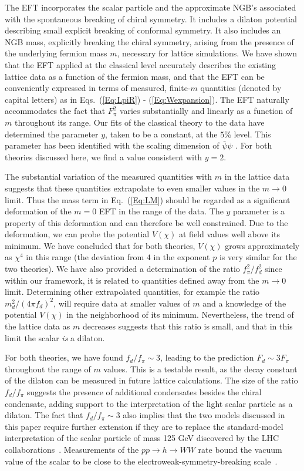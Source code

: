 \documentclass[a4paper,11pt]{article}
\begin{document}
The EFT incorporates the scalar particle and the approximate NGB's associated with the spontaneous breaking of chiral symmetry. 
It includes a dilaton potential describing small explicit breaking of conformal symmetry. It also includes an NGB mass, 
explicitly breaking the chiral symmetry, arising from the presence of the underlying fermion mass $m$, necessary for lattice simulations. 
We have shown that the EFT applied at the classical level accurately describes the existing lattice data as a function
of the fermion mass, and that the EFT can be conveniently expressed in terms of measured, finite-$m$ quantities (denoted by capital letters) as in Eqs.~(\ref{Eq:LpiR}) - (\ref{Eq:Wexpansion}).
The EFT naturally accommodates the fact that $F_{\pi}^2$ varies substantially and linearly as a function of $m$
throughout its range. Our fits of the classical theory to the data have determined the parameter $y$, taken to be a constant, at the $5\%$ level. This 
parameter has been identified with the scaling dimension of $\bar{\psi}\psi$ \cite{LLB}. For both theories discussed here, we find a value consistent with $y = 2$.

The substantial variation of the measured quantities with $m$ in the lattice data suggests that these quantities extrapolate to even smaller values in the $m \rightarrow 0$ limit. Thus the mass term in Eq.~(\ref{Eq:LM}) should be regarded as a significant deformation of the $m = 0$ EFT in the range of the data. The $y$ parameter is a property of this deformation and can therefore be well constrained. Due to the deformation, we can probe the potential $V(\chi)$ at field values well above its minimum. We have concluded that for both theories, $V(\chi)$ grows approximately as $\chi^4$ in this range (the deviation from $4$ in the exponent $p$ is very similar for the two theories). We have also provided a determination of the ratio $f_{\pi}^2/f_d^2$ since within our framework, it is related to quantities defined away from the $m \rightarrow 0$ limit. Determining other extrapolated quantities, for example the ratio $m_d^2/(4 \pi f_{d})^2$, will require data at smaller values of $m$ and a knowledge of the potential $V(\chi)$ in the neighborhood of its minimum. Nevertheless, the trend of the lattice data as $m$ decreases suggests that this ratio is small, and that in this limit the scalar \textit{is} a dilaton. 

For both theories, we have found  $f_d/f_\pi\sim3$, leading to the prediction $F_d \sim 3 F_{\pi}$ throughout the range of $m$ values. This is a testable result, as the decay constant of the dilaton can be measured in future lattice calculations. The size of the ratio $f_d/f_\pi$ suggests the presence of additional condensates besides the chiral condensate, adding support to the interpretation of the light scalar particle as a dilaton.  The fact that $f_d/f_\pi\sim3$ also implies that the two models discussed in this paper require further extension if they are to replace the standard-model interpretation of the scalar particle of mass 125 GeV discovered by the LHC collaborations~\cite{Aad:2012tfa,Chatrchyan:2012xdj}. Measurements of the $pp \rightarrow h \rightarrow WW$ rate bound the vacuum value of the scalar to be close to the electroweak-symmetry-breaking scale~\cite{TheATLASandCMSCollaborations:2015bln}.
\end{document}
